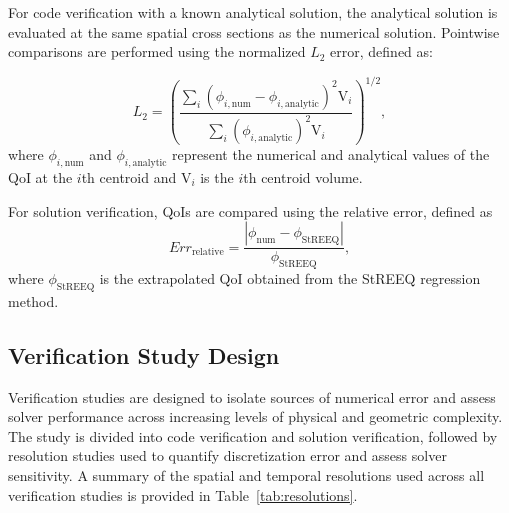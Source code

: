 For code verification with a known analytical solution, the analytical solution is evaluated at the same spatial cross sections as the numerical solution. Pointwise comparisons are performed using the normalized $L_2$ error, defined as:

\begin{equation}
L_2 = \left( \frac{\sum_i (\phi_{i,\text{num}} - \phi_{i,\text{analytic}})^2\text{V}_i}{\sum_i (\phi_{i,\text{analytic}})^2 \text{V}_i} \right)^{1/2},
\end{equation}
where $\phi_{i,\text{num}}$ and $\phi_{i,\text{analytic}}$ represent the numerical and analytical values of the QoI at the $i$th centroid and $\text{V}_i$ is the $i$th centroid volume.

For solution verification, QoIs are compared using the relative error, defined as
\begin{equation}
Err_{\text{relative}} = \frac{|\phi_{\text{num}} - \phi_{\text{StREEQ}}|}{\phi_{\text{StREEQ}}},
\end{equation}
where $\phi_{\text{StREEQ}}$ is the extrapolated QoI obtained from the StREEQ regression method.

\subsection{Verification Study Design} 

Verification studies are designed to isolate sources of numerical error and assess solver performance across increasing levels of physical and geometric complexity. The study is divided into code verification and solution verification, followed by resolution studies used to quantify discretization error and assess solver sensitivity. A summary of the spatial and temporal resolutions used across all verification studies is provided in Table~\ref{tab:resolutions}.

